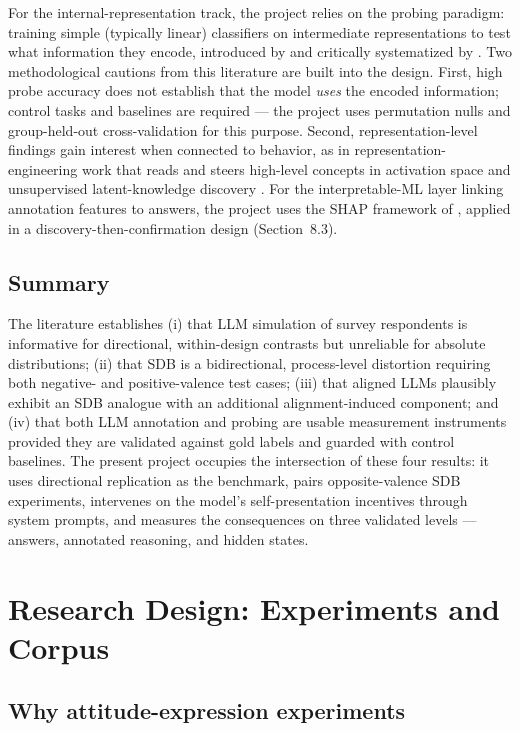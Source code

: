 \documentclass[14pt,a4paper]{extarticle}
\begin{document}
For the internal-representation track, the project relies on the probing paradigm: training simple (typically linear) classifiers on intermediate representations to test what information they encode, introduced by \cite{alain2016} and critically systematized by \cite{belinkov2022}. Two methodological cautions from this literature are built into the design. First, high probe accuracy does not establish that the model \emph{uses} the encoded information; control tasks and baselines are required \cite{hewitt2019} --- the project uses permutation nulls and group-held-out cross-validation for this purpose. Second, representation-level findings gain interest when connected to behavior, as in representation-engineering work that reads and steers high-level concepts in activation space \cite{zou2023} and unsupervised latent-knowledge discovery \cite{burns2022}. For the interpretable-ML layer linking annotation features to answers, the project uses the SHAP framework of \cite{lundberg2017}, applied in a discovery-then-confirmation design (Section~8.3).

\subsection{Summary}

The literature establishes (i) that LLM simulation of survey respondents is informative for directional, within-design contrasts but unreliable for absolute distributions; (ii) that SDB is a bidirectional, process-level distortion requiring both negative- and positive-valence test cases; (iii) that aligned LLMs plausibly exhibit an SDB analogue with an additional alignment-induced component; and (iv) that both LLM annotation and probing are usable measurement instruments provided they are validated against gold labels and guarded with control baselines. The present project occupies the intersection of these four results: it uses directional replication as the benchmark, pairs opposite-valence SDB experiments, intervenes on the model's self-presentation incentives through system prompts, and measures the consequences on three validated levels --- answers, annotated reasoning, and hidden states.

\section{Research Design: Experiments and Corpus}

\subsection{Why attitude-expression experiments}
\end{document}
